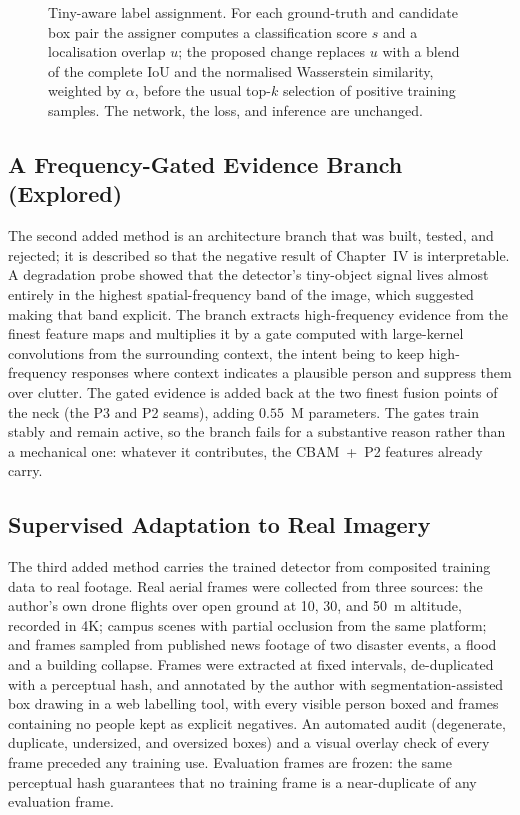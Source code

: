\begin{figure}[tbp]
  \centering
  \caption{Tiny-aware label assignment. For each ground-truth and candidate box
  pair the assigner computes a classification score $s$ and a localisation
  overlap $u$; the proposed change replaces $u$ with a blend of the complete IoU
  and the normalised Wasserstein similarity, weighted by $\alpha$, before the
  usual top-$k$ selection of positive training samples. The network, the loss,
  and inference are unchanged.}
  \label{fig:assignmech}
\end{figure}

\subsection{A Frequency-Gated Evidence Branch (Explored)}
\label{sec:fccgmethod}
The second added method is an architecture branch that was built, tested, and
rejected; it is described so that the negative result of Chapter~IV is
interpretable. A degradation probe showed that the detector's tiny-object signal
lives almost entirely in the highest spatial-frequency band of the image, which
suggested making that band explicit. The branch extracts high-frequency
evidence from the finest feature maps and multiplies it by a gate computed with
large-kernel convolutions from the surrounding context, the intent being to keep
high-frequency responses where context indicates a plausible person and suppress
them over clutter. The gated evidence is added back at the two finest fusion
points of the neck (the P3 and P2 seams), adding $0.55$~M parameters. The gates
train stably and remain active, so the branch fails for a substantive reason
rather than a mechanical one: whatever it contributes, the CBAM~+~P2 features
already carry.

\subsection{Supervised Adaptation to Real Imagery}
\label{sec:adaptmethod}
The third added method carries the trained detector from composited training
data to real footage. Real aerial frames were collected from three sources: the
author's own drone flights over open ground at 10, 30, and 50~m altitude,
recorded in 4K; campus scenes with partial occlusion from the same platform; and
frames sampled from published news footage of two disaster events, a flood and a
building collapse. Frames were extracted at fixed intervals, de-duplicated with
a perceptual hash, and annotated by the author with segmentation-assisted box
drawing in a web labelling tool, with every visible person boxed and frames
containing no people kept as explicit negatives. An automated audit
(degenerate, duplicate, undersized, and oversized boxes) and a visual overlay
check of every frame preceded any training use. Evaluation frames are frozen:
the same perceptual hash guarantees that no training frame is a near-duplicate
of any evaluation frame.

